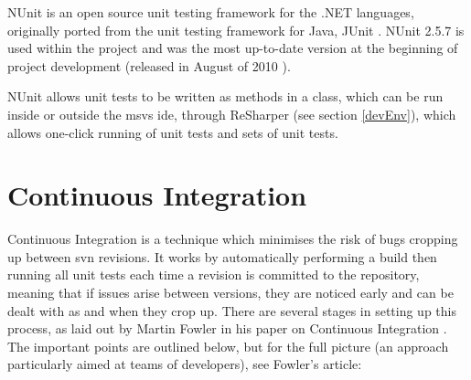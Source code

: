 \documentclass{l4proj}
\begin{document}
NUnit is an open source unit testing framework for the .NET languages, originally ported from the unit testing framework for Java, JUnit \cite{nUnitHome}.  NUnit 2.5.7 is used within the project and was the most up-to-date version at the beginning of project development (released in August of 2010 \cite{nUnitRelease}).  

NUnit allows unit tests to be written as methods in a class, which can be run inside or outside the \gls{msvs} \gls{ide}, through ReSharper (see section \ref{devEnv}), which allows one-click running of unit tests and sets of unit tests.

\section{Continuous Integration}
\label{continuousIntegration}
Continuous Integration is a technique which minimises the risk of bugs cropping up between \gls{svn} revisions.  It works by automatically performing a build then running all unit tests each time a revision is committed to the repository, meaning that if issues arise between versions, they are noticed early and can be dealt with as and when they crop up.  There are several stages in setting up this process, as laid out by Martin Fowler in his paper on Continuous Integration \cite{fowlerCI}.  The important points are outlined below, but for the full picture (an approach particularly aimed at teams of developers), see Fowler's article:
\end{document}
